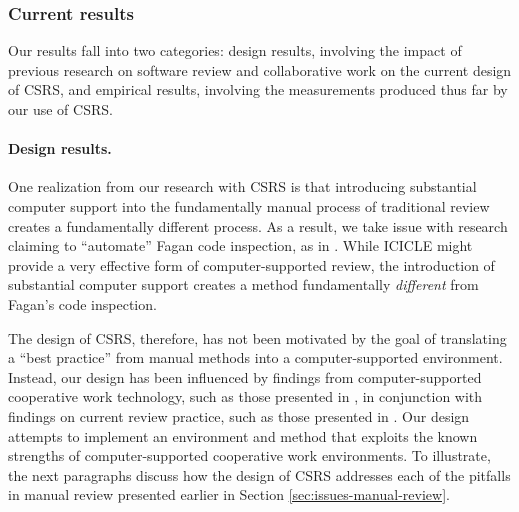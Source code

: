 \subsubsection{Current results}
\label{sec:results}

Our results fall into two categories: design results, involving the
impact of previous research on software review and collaborative work on
the current design of CSRS, and empirical results, involving the
measurements produced thus far by our use of CSRS.

\paragraph{Design results.} 

One realization from our research with CSRS is that introducing substantial
computer support into the fundamentally manual process of traditional
review creates a fundamentally different process.  As a result, we take
issue with research claiming to ``automate'' Fagan code inspection, as in
\cite{Brothers90}.  While ICICLE might provide a very effective form of
computer-supported review, the introduction of substantial computer support
creates a method fundamentally {\em different}\/ from Fagan's code
inspection.

The design of CSRS, therefore, has not been motivated by the goal of
translating a ``best practice'' from manual methods into a
computer-supported environment. Instead, our design has been influenced by
findings from computer-supported cooperative work technology, such as those
presented in \cite{Nunamaker91}, in conjunction with findings on current
review practice, such as those presented in \cite{Deimel91,Freedman90}.
Our design attempts to implement an environment and method that exploits
the known strengths of computer-supported cooperative work environments.
To illustrate, the next paragraphs discuss how the design of CSRS addresses
each of the pitfalls in manual review presented earlier in Section
\ref{sec:issues-manual-review}.

